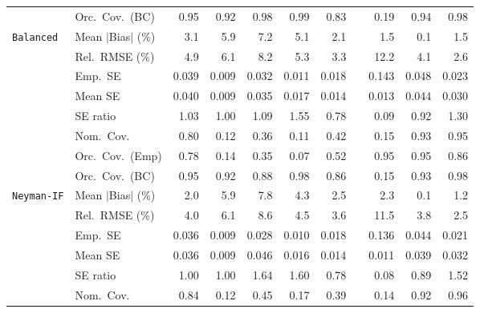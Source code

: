 \begin{landscape}
\begin{longtable}{llrrrrrrrrr}
 & Orc.\ Cov.\ (BC) & \cellcolor{rankone}0.95 & \cellcolor{rankthree}0.92 & \cellcolor{rankthree}0.98 & 0.99 & 0.83 &  & 0.19 & \cellcolor{ranktwo}0.94 & \cellcolor{rankthree}0.98 \\
\addlinespace[2pt]
\quad \texttt{Balanced} & Mean $|$Bias$|$ (\%) & 3.1 & 5.9 & 7.2 & 5.1 & \cellcolor{rankthree}2.1 &  & \cellcolor{ranktwo}1.5 & \cellcolor{rankone}0.1 & \cellcolor{ranktwo}1.5 \\
 & Rel.\ RMSE (\%) & 4.9 & 6.1 & 8.2 & 5.3 & \cellcolor{ranktwo}3.3 &  & 12.2 & \cellcolor{rankthree}4.1 & \cellcolor{rankone}2.6 \\
 & Emp.\ SE & 0.039 & 0.009 & 0.032 & 0.011 & 0.018 &  & 0.143 & 0.048 & 0.023 \\
 & Mean SE & 0.040 & 0.009 & 0.035 & 0.017 & 0.014 &  & 0.013 & 0.044 & 0.030 \\
 & SE ratio & \cellcolor{ranktwo}1.03 & \cellcolor{rankone}1.00 & 1.09 & 1.55 & 0.78 &  & 0.09 & \cellcolor{rankthree}0.92 & 1.30 \\
 & Nom.\ Cov. & \cellcolor{rankthree}0.80 & 0.12 & 0.36 & 0.11 & 0.42 &  & 0.15 & \cellcolor{ranktwo}0.93 & \cellcolor{rankone}0.95 \\
 & Orc.\ Cov.\ (Emp) & \cellcolor{rankthree}0.78 & 0.14 & 0.35 & 0.07 & 0.52 &  & \cellcolor{rankone}0.95 & \cellcolor{rankone}0.95 & \cellcolor{ranktwo}0.86 \\
 & Orc.\ Cov.\ (BC) & \cellcolor{rankone}0.95 & \cellcolor{rankthree}0.92 & 0.88 & \cellcolor{rankthree}0.98 & 0.86 &  & 0.15 & \cellcolor{ranktwo}0.93 & \cellcolor{rankthree}0.98 \\
\addlinespace[2pt]
\quad \texttt{Neyman-IF} & Mean $|$Bias$|$ (\%) & \cellcolor{rankthree}2.0 & 5.9 & 7.8 & 4.3 & 2.5 &  & 2.3 & \cellcolor{rankone}0.1 & \cellcolor{ranktwo}1.2 \\
 & Rel.\ RMSE (\%) & 4.0 & 6.1 & 8.6 & 4.5 & \cellcolor{ranktwo}3.6 &  & 11.5 & \cellcolor{rankthree}3.8 & \cellcolor{rankone}2.5 \\
 & Emp.\ SE & 0.036 & 0.009 & 0.028 & 0.010 & 0.018 &  & 0.136 & 0.044 & 0.021 \\
 & Mean SE & 0.036 & 0.009 & 0.046 & 0.016 & 0.014 &  & 0.011 & 0.039 & 0.032 \\
 & SE ratio & \cellcolor{rankone}1.00 & \cellcolor{rankone}1.00 & 1.64 & 1.60 & \cellcolor{rankthree}0.78 &  & 0.08 & \cellcolor{ranktwo}0.89 & 1.52 \\
 & Nom.\ Cov. & \cellcolor{rankthree}0.84 & 0.12 & 0.45 & 0.17 & 0.39 &  & 0.14 & \cellcolor{ranktwo}0.92 & \cellcolor{rankone}0.96 \\

\end{longtable}
\end{landscape}
